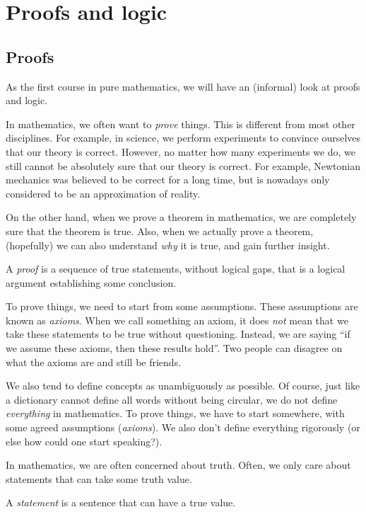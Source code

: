 \documentclass[a4paper]{article}
\begin{document}
\section{Proofs and logic}
\subsection{Proofs}
As the first course in pure mathematics, we will have an (informal) look at proofs and logic.

In mathematics, we often want to \emph{prove} things. This is different from most other disciplines. For example, in science, we perform experiments to convince ourselves that our theory is correct. However, no matter how many experiments we do, we still cannot be absolutely sure that our theory is correct. For example, Newtonian mechanics was believed to be correct for a long time, but is nowadays only considered to be an approximation of reality.

On the other hand, when we prove a theorem in mathematics, we are completely sure that the theorem is true. Also, when we actually prove a theorem, (hopefully) we can also understand \emph{why} it is true, and gain further insight.

\begin{defi}[Proof]
  A \emph{proof} is a sequence of true statements, without logical gaps, that is a logical argument establishing some conclusion.
\end{defi}
To prove things, we need to start from some assumptions. These assumptions are known as \emph{axioms}. When we call something an axiom, it does \emph{not} mean that we take these statements to be true without questioning. Instead, we are saying ``if we assume these axioms, then these results hold''. Two people can disagree on what the axioms are and still be friends.

We also tend to define concepts as unambiguously as possible. Of course, just like a dictionary cannot define all words without being circular, we do not define \emph{everything} in mathematics.
To prove things, we have to start somewhere, with some agreed assumptions (\emph{axioms}). We also don't define everything rigorously (or else how could one start speaking?).

In mathematics, we are often concerned about truth. Often, we only care about statements that can take some truth value.
\begin{defi}[Statement]
  A \emph{statement} is a sentence that can have a true value.
\end{defi}
\end{document}
